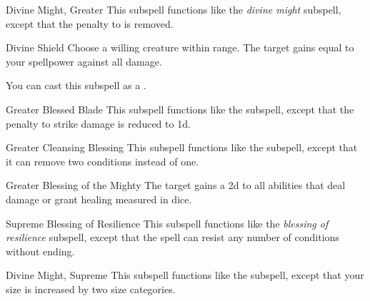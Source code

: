 \begin{ability}[\nth{6}]{Divine Might, Greater}
This subspell functions like the \textit{divine might} subspell, except that the penalty to  is removed.
\end{ability}
\vspace{0.25em}


\begin{ability}[\nth{6}]{Divine Shield}
Choose a willing creature within \rngclose range.
The target gains  equal to your spellpower against all damage.

You can cast this subspell as a .
\end{ability}
\vspace{0.25em}


\begin{ability}[\nth{6}]{Greater Blessed Blade}
This subspell functions like the  subspell, except that the penalty to strike damage is reduced to \minus1d.
\end{ability}
\vspace{0.25em}


\begin{ability}[\nth{6}]{Greater Cleansing Blessing}
This subspell functions like the  subspell, except that it can remove two conditions instead of one.
\end{ability}
\vspace{0.25em}


\begin{ability}[\nth{7}]{Greater Blessing of the Mighty}
The target gains a \plus2d  to all abilities that deal damage or grant healing measured in dice.
\end{ability}
\vspace{0.25em}


\begin{ability}[\nth{7}]{Supreme Blessing of Resilience}
This subspell functions like the \textit{blessing of resilience} subspell, except that the spell can resist any number of conditions without ending.
\end{ability}
\vspace{0.25em}


\begin{ability}[\nth{9}]{Divine Might, Supreme}
This subspell functions like the  subspell, except that your size is increased by two size categories.
\end{ability}
\vspace{0.25em}


